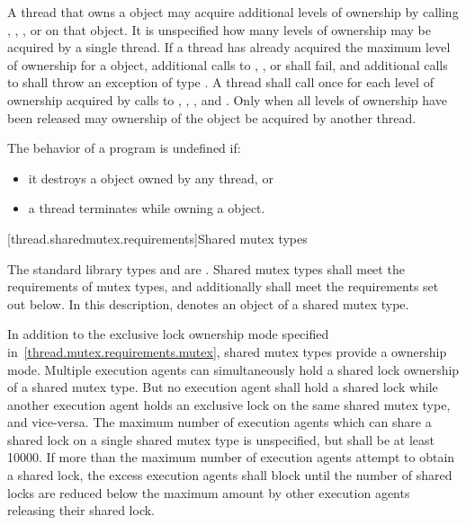 \pnum
A thread that owns a  object may acquire additional
levels of ownership by calling , ,
, or  on that object. It is
unspecified how many levels of ownership may be acquired by a single thread. If
a thread has already acquired the maximum level of ownership for a
 object, additional calls to ,
, or  shall fail, and additional
calls to  shall throw an exception of type . A
thread shall call  once for each level of ownership acquired by
calls to , , , and
. Only when all levels of ownership have been released
may ownership of the object be acquired by another thread.

\pnum
The behavior of a program is undefined if:
\begin{itemize}
\item it destroys a  object owned by any thread, or
\item a thread terminates while owning a  object.
\end{itemize}


[thread.sharedmutex.requirements]{Shared mutex types}

\pnum
The standard library types  and 
are . Shared mutex types shall meet the requirements of
mutex types, and additionally
shall meet the requirements set out below. In this description,
 denotes an object of a shared mutex type.

\pnum
In addition to the exclusive lock ownership mode specified
in~\ref{thread.mutex.requirements.mutex}, shared mutex types provide a
 ownership mode. Multiple execution agents can
simultaneously hold a shared lock ownership of a shared mutex type. But no
execution agent shall hold a shared lock while another execution agent holds an
exclusive lock on the same shared mutex type, and vice-versa. The maximum
number of execution agents which can share a shared lock on a single shared
mutex type is unspecified, but shall be at least 10000. If more than the
maximum number of execution agents attempt to obtain a shared lock, the
excess execution agents shall block until the number of shared locks are
reduced below the maximum amount by other execution agents releasing their
shared lock.

